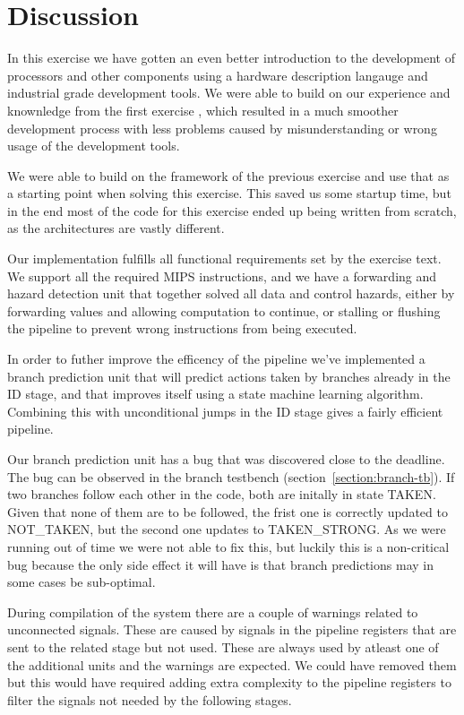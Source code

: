 \section{Discussion}

In this exercise we have gotten an even better introduction to the development of 
processors and other components using a hardware description langauge and industrial
grade development tools. We were able to build on our experience and knownledge from the first
exercise \cite{multicycle}, which resulted in a much smoother development process with less problems
caused by misunderstanding or wrong usage of the development tools.

We were able to build on the framework of the previous exercise and use that as a 
starting point when solving this exercise. This saved us some startup time, but in the
end most of the code for this exercise ended up being written from scratch, as the 
architectures are vastly different.

Our implementation fulfills all functional requirements set by the exercise text.
We support all the required MIPS instructions, and we have a forwarding and hazard
detection unit that together solved all data and control hazards, either by forwarding
values and allowing computation to continue, or stalling or flushing the pipeline to 
prevent wrong instructions from being executed.

In order to futher improve the efficency of the pipeline we've implemented a branch
prediction unit that will predict actions taken by branches already in the ID stage,
and that improves itself using a state machine learning algorithm. Combining this with
unconditional jumps in the ID stage gives a fairly efficient pipeline.

Our branch prediction unit has a bug that was discovered close to the deadline. The bug
can be observed in the branch testbench (section~\ref{section:branch-tb}). If two
branches follow each other in the code, both are initally in state TAKEN. Given that none 
of them are to be followed, the frist one is correctly updated to NOT\_TAKEN, but the second one
updates to TAKEN\_STRONG. As we were running out of time we were
not able to fix this, but luckily this is a non-critical bug because the only side
effect it will have is that branch predictions may in some cases be sub-optimal.

During compilation of the system there are a couple of warnings related to unconnected
signals. These are caused by signals in the pipeline registers that are sent to the
related stage but not used. These are always used by atleast one of the additional units
and the warnings are expected. We could have removed them but this would have required
adding extra complexity to the pipeline registers to filter the signals not needed by
the following stages.


